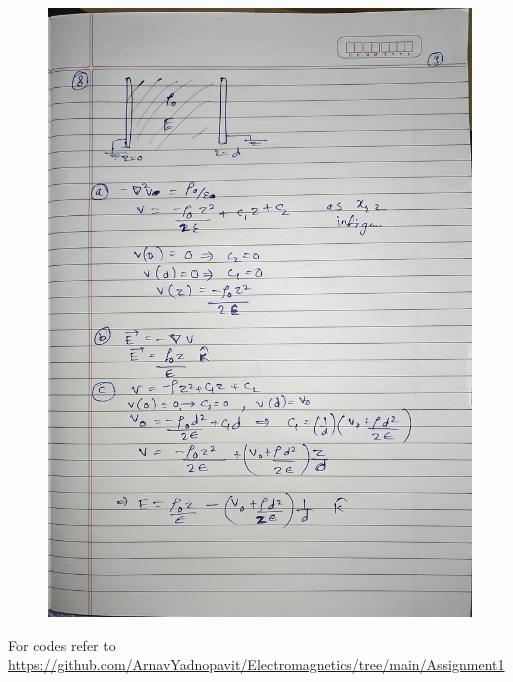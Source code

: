 \documentclass{article}
\begin{document}
\begin{figure}[H]
    \centering
    \includegraphics[width=\textwidth]{figs/written/9.jpg}
\end{figure}
For codes refer to \\
\url{https://github.com/ArnavYadnopavit/Electromagnetics/tree/main/Assignment1}
\end{document}
